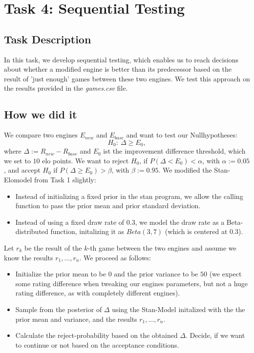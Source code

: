 \section{Task 4: Sequential Testing}
\subsection{Task Description}
In this task, we develop sequential testing, which enables us to reach decisions about whether a modified engine is better than its predecessor based on the result of 'just enough' games between these two engines. We test this approach on the results provided in the \textit{games.csv} file.
\subsection{How we did it}
We compare two engines $E_{new}$ and $E_{base}$ and want to test our Nullhypotheses:
\begin{equation}
H_0:~\Delta \geq E_0,
\end{equation}
where $\Delta:= R_{new} - R_{base}$ and $E_0$ ist the improvement difference threshold, which we set to $10$ elo points. We want to reject $H_0$, if $P(\Delta < E_0) < \alpha$, with $\alpha := 0.05$, and accept $H_0$ if $P(\Delta \geq E_0) > \beta$, with $\beta := 0.95$. We modified the Stan-Elomodel from Task 1 slightly:
\begin{itemize}
\item Instead of initializing a fixed prior in the stan program, we allow the calling function to pass the prior mean and prior standard deviation. 
\item Instead of using a fixed draw rate of $0.3$, we model the draw rate as a Beta-distributed function, initalizing it as $Beta(3,7)$  (which is centered at $0.3$). 
\end{itemize}
\par Let $r_k$ be the result of the $k$-th game between the two engines and assume we know the results $r_1, \dots, r_n$. We proceed as follows:
\begin{itemize}
\item Initialize the prior mean to be $0$ and the prior variance to be $50$ (we expect some rating difference when tweaking our engines parameters, but not a huge rating difference, as with completely different engines).
\item Sample from the posterior of $\Delta$ using the Stan-Model initalized with the the prior mean and variance, and the results $r_1, \dots, r_n$.
\item Calculate the reject-probability based on the obtained $\Delta$. Decide, if we want to continue or not based on the acceptance conditions.
\end{itemize}
